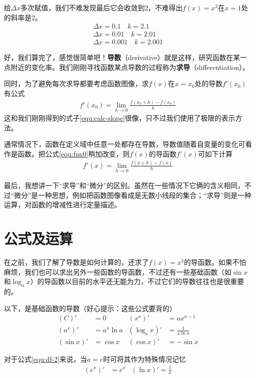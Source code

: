 给$\Delta x$多次赋值，我们不难发现最后它会收敛到2，不难得出$f(x)=x^2$在$x=1$处的斜率是2。
\begin{gather*}
    \Delta x=0.1 \quad k=2.1 \\
    \Delta x=0.01 \quad k=2.01 \\
    \Delta x=0.001 \quad k=2.001
\end{gather*}

好，我们算完了，感觉很简单吧！\textbf{导数}（derivative）就是这样，研究函数在某一点附近的变化率。我们刚刚寻找函数某点导数的过程称为\textbf{求导}（differentiation）。

同时，为了避免每次求导都要考虑函数图像，求$f(x)$在$x=x_0$处的导数$f'(x_0)$有公式
\begin{gather}
    f'(x_0)=\lim_{h\to0}\frac{f(x_0+h)-f(x_0)}{h} \label{equ:fpx0}
\end{gather}
这和我们刚刚得到的式子\eqref{equ:calc-slope}很像，只不过我们使用了极限的表示方法。

通常情况下，函数在定义域中任意一处都存在导数，导数值随着自变量的变化可看作是函数。把公式\eqref{equ:fpx0}稍加改变，则$f(x)$的导函数$f'(x)$可如下计算
\begin{gather}
    f'(x)=\lim_{h\to0}\frac{f(x+h)-f(x)}{h} \label{equ:fpx}
\end{gather}

最后，我想讲一下“求导”和“微分”的区别。虽然在一些情况下它俩的含义相同，不过“微分”是一种思想，例如把函数图像看成是无数小线段的集合；“求导”则是一种运算，对函数的增减性进行定量描述。

\section{公式及运算}
在之前，我们了解了导数是如何计算的，还求了$f(x)=x^3$的导函数。如果不怕麻烦，我们也可以求出另外一些函数的导函数，不过还有一些基础函数（如$\sin x$和$\log_ax$）的导函数以目前的水平还无能为力，不过它们的导数往往也是很重要的。

以下，是基础函数的导数（好心提示：这些公式要背的）
\begin{align}
    (C)'&=0 & (x^a)'&=ax^{a-1} \label{equ:df-1} \\
    (a^x)'&=a^x\ln a & (\log_ax)'&=\frac{1}{x\ln a} \label{equ:df-2} \\
    (\sin x)'&=\cos x & (\cos x)'&=-\sin x \label{equ:df-3}
\end{align}

对于公式\eqref{equ:df-2}来说，当$a=e$时可将其作为特殊情况记忆
\begin{align*}
    (e^x)'&=e^x & (\ln x)'=\frac{1}{x}
\end{align*}

